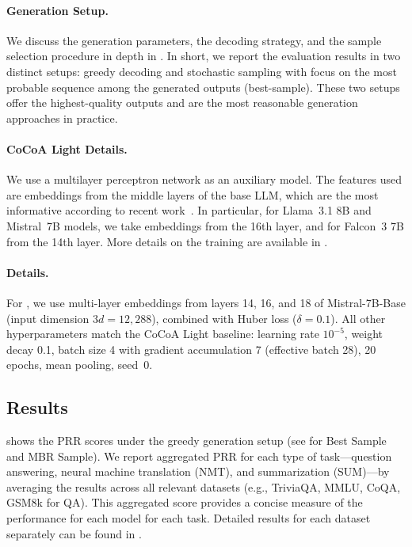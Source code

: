 \paragraph{Generation Setup.}
We discuss the generation parameters, the decoding strategy, and the sample selection procedure in depth in . In short, we report the evaluation results in two distinct setups: greedy decoding and stochastic sampling with focus on the most probable sequence among the generated outputs (best-sample). These two setups offer the highest-quality outputs and are the most reasonable generation approaches in practice.

\paragraph{CoCoA Light Details.}
We use a multilayer perceptron network as an auxiliary model. The features used are embeddings from the middle layers of the base LLM, which are the most informative according to recent work~\cite{chen2024inside}. In particular, for Llama~3.1 8B and Mistral~7B models, we take embeddings from the 16th layer, and for Falcon~3 7B from the 14th layer. More details on the training are available in .

\paragraph{\method{} Details.}
For \method{}, we use multi-layer embeddings from layers 14, 16, and 18 of Mistral-7B-Base (input dimension $3d = 12{,}288$), combined with Huber loss ($\delta = 0.1$). All other hyperparameters match the CoCoA Light baseline: learning rate $10^{-5}$, weight decay 0.1, batch size 4 with gradient accumulation 7 (effective batch 28), 20 epochs, mean pooling, seed~0.

\subsection{Results}
\label{sec:results}

 shows the PRR scores under the greedy generation setup (see  for Best Sample and MBR Sample). We report aggregated PRR for each type of task---question answering, neural machine translation (NMT), and summarization (SUM)---by averaging the results across all relevant datasets (e.g., TriviaQA, MMLU, CoQA, GSM8k for QA). This aggregated score provides a concise measure of the performance for each model for each task. Detailed results for each dataset separately can be found in .

